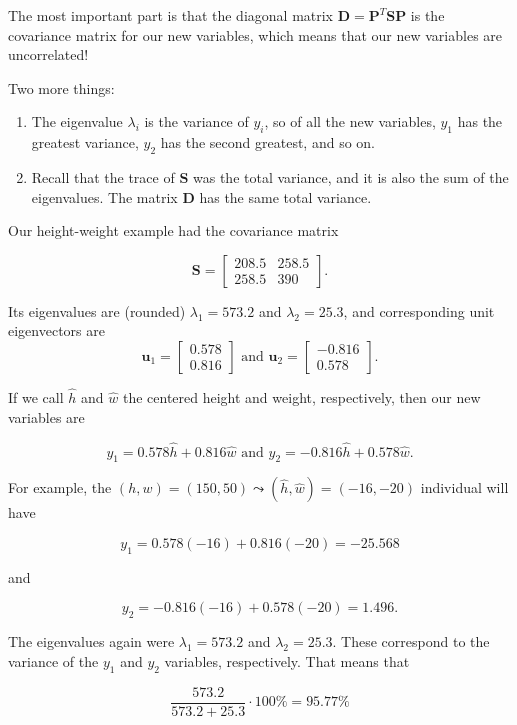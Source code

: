 \documentclass[
]{book}
\theoremstyle{definition}
\theoremstyle{definition}
\theoremstyle{definition}
\theoremstyle{definition}
\theoremstyle{remark}
\begin{document}
The most important part is that the diagonal matrix \(\mathbf{D}=\mathbf{P}^T\mathbf{S}\mathbf{P}\) is the covariance matrix for our new variables, which means that our new variables are uncorrelated!

Two more things:

\begin{enumerate}
\def\labelenumi{\arabic{enumi}.}
\item
  The eigenvalue \(\lambda_i\) is the variance of \(y_i\), so of all the new variables, \(y_1\) has the greatest variance, \(y_2\) has the second greatest, and so on.
\item
  Recall that the trace of \(\mathbf{S}\) was the total variance, and it is also the sum of the eigenvalues. The matrix \(\mathbf{D}\) has the same total variance.
\end{enumerate}

Our height-weight example had the covariance matrix

\[\mathbf{S}=\begin{bmatrix} 208.5 & 258.5\\258.5 & 390\end{bmatrix}.\]

Its eigenvalues are (rounded) \(\lambda_1=573.2\) and \(\lambda_2=25.3\), and corresponding unit eigenvectors are
\[\mathbf{u}_1=\begin{bmatrix}0.578 \\0.816\end{bmatrix} \text{ and } \mathbf{u}_2=\begin{bmatrix} -0.816\\0.578\end{bmatrix}.\]

If we call \(\hat{h}\) and \(\hat{w}\) the centered height and weight, respectively, then our new variables are

\[y_1=0.578\hat{h}+0.816\hat{w} \text{ and }y_2=-0.816\hat{h}+0.578\hat{w}.\]

For example, the \((h,w)=(150,50)\leadsto (\hat{h},\hat{w})=(-16,-20)\) individual will have

\[y_1=0.578(-16)+0.816(-20)=-25.568\]

and

\[y_2=-0.816(-16)+0.578(-20)=1.496.\]

The eigenvalues again were \(\lambda_1=573.2\) and \(\lambda_2=25.3\). These correspond to the variance of the \(y_1\) and \(y_2\) variables, respectively. That means that

\[\frac{573.2}{573.2+25.3}\cdot 100\%=95.77\%\]
\end{document}
